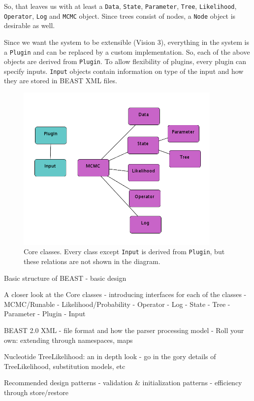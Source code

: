 \documentclass{book}
\begin{document}
So, that leaves us with at least a {\tt Data}, {\tt State}, {\tt Parameter}, 
{\tt Tree}, {\tt Likelihood}, {\tt Operator}, {\tt Log} and {\tt MCMC} object. Since trees
consist of nodes, a {\tt Node} object is desirable as well.

Since we want the system to be extensible (Vision 3), everything in the system is 
a {\tt Plugin} and can be replaced by a custom implementation. So, each of the above
objects are derived from {\tt Plugin}. To allow flexibility of plugins, every plugin 
can specify inputs. {\tt Input} objects contain information on type of the input and 
how they are stored in BEAST XML files.


\begin{figure}
\begin{center}
\includegraphics[width=10cm]{BEAST.png}
\end{center}
\caption{\label{fig.core}Core classes. Every class except {\tt Input} is derived
from {\tt Plugin}, but these relations are not shown in the diagram.}
\end{figure}






Basic structure of BEAST
- basic design

A closer look at the Core classes
- introducing interfaces for each of the classes
  - MCMC/Runable
  - Likelihood/Probability
  - Operator
  - Log
  - State
    - Tree
    - Parameter
  - Plugin
  - Input

BEAST 2.0 XML 
- file format and how the parser processing model
- Roll your own: extending through namespaces, maps

Nucleotide TreeLikelihood: an in depth look
- go in the gory details of TreeLikelihood, substitution models, etc

Recommended design patterns
- validation \& initialization patterns
- efficiency through store/restore
\end{document}
